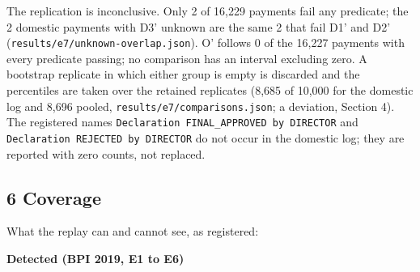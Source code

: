 \documentclass[
  10pt,
]{article}
\begin{document}
The replication is inconclusive. Only 2 of 16,229 payments fail any
predicate; the 2 domestic payments with D3' unknown are the same 2 that
fail D1' and D2' (\texttt{results/e7/unknown-overlap.json}). O' follows
0 of the 16,227 payments with every predicate passing; no comparison has
an interval excluding zero. A bootstrap replicate in which either group
is empty is discarded and the percentiles are taken over the retained
replicates (8,685 of 10,000 for the domestic log and 8,696 pooled,
\texttt{results/e7/comparisons.json}; a deviation, Section 4). The
registered names \texttt{Declaration\ FINAL\_APPROVED\ by\ DIRECTOR} and
\texttt{Declaration\ REJECTED\ by\ DIRECTOR} do not occur in the
domestic log; they are reported with zero counts, not replaced.

\hypertarget{coverage}{%
\subsection{6 Coverage}\label{coverage}}

What the replay can and cannot see, as registered:

\textbf{Detected (BPI 2019, E1 to E6)}
\end{document}
